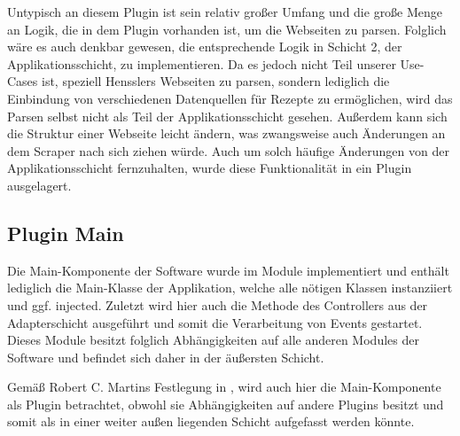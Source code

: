 Untypisch an diesem Plugin ist sein relativ großer Umfang und die große Menge an Logik, die in dem Plugin vorhanden ist, um die Webseiten zu parsen. Folglich wäre es auch denkbar gewesen, die entsprechende Logik in Schicht 2, der Applikationsschicht, zu implementieren. Da es jedoch nicht Teil unserer Use-Cases ist, speziell Hensslers Webseiten zu parsen, sondern lediglich die Einbindung von verschiedenen Datenquellen für Rezepte zu ermöglichen, wird das Parsen selbst nicht als Teil der Applikationsschicht gesehen. Außerdem kann sich die Struktur einer Webseite leicht ändern, was zwangsweise auch Änderungen an dem Scraper nach sich ziehen würde. Auch um solch häufige Änderungen von der Applikationsschicht fernzuhalten, wurde diese Funktionalität in ein Plugin ausgelagert.

\subsection{Plugin Main}
Die Main-Komponente der Software wurde im Module \href{https://github.com/anditru/quickie/tree/bb41442c7f1ffbfcd3117cd86a40f7932e543a33/0-quickie-plugin-main}{} implementiert und enthält lediglich die Main-Klasse der Applikation, welche alle nötigen Klassen instanziiert und ggf. injected. Zuletzt wird hier auch die Methode  des Controllers aus der Adapterschicht ausgeführt und somit die Verarbeitung von Events gestartet. Dieses Module besitzt folglich Abhängigkeiten auf alle anderen Modules der Software und befindet sich daher in der äußersten Schicht.

Gemäß Robert C. Martins Festlegung in \cite{Martin.2018}, wird auch hier die Main-Komponente als Plugin betrachtet, obwohl sie Abhängigkeiten auf andere Plugins besitzt und somit als in einer weiter außen liegenden Schicht aufgefasst werden könnte.
